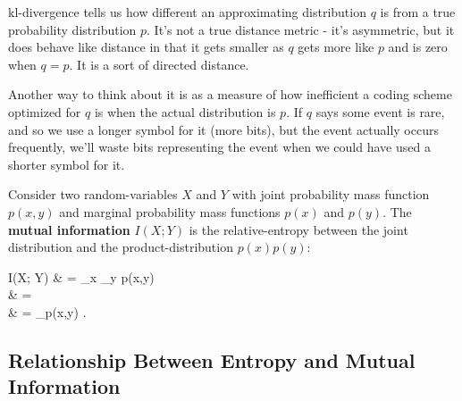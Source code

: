 \documentclass{article}
\begin{document}
\begin{remark}
\@{kl-divergence} tells us how different an approximating distribution $q$ is from a true probability distribution $p.$ It's not a true distance metric - it's asymmetric, but it does behave like distance in that it gets smaller as $q$ gets more like $p$ and is zero when $q = p.$ It is a sort of directed distance.

Another way to think about it is as a measure of how inefficient a coding scheme optimized for $q$ is when the actual distribution is $p.$ If $q$ says some event is rare, and so we use a longer symbol for it (more bits), but the event actually occurs frequently, we'll waste bits representing the event when we could have used a shorter symbol for it.
\end{remark}

\begin{definition}\label{mutual-information}
	Consider two \@{random-variables} $X$ and $Y$ with \@{joint probability mass function} $p(x,y)$ and \@{marginal probability mass functions} $p(x)$ and $p(y).$ The \textbf{mutual information} $I(X; Y)$ is the \@{relative-entropy} between the \@{joint distribution} and the \@{product-distribution} $p(x)p(y)$:

\bal
	I(X; Y) & = \sum_{x \in {}} \sum_{y \in {}} p(x,y)  \\
	        & =  \\
		& = \E_{p(x,y)} .
\eal

\end{definition}

\subsection{Relationship Between Entropy and Mutual Information}
\end{document}
